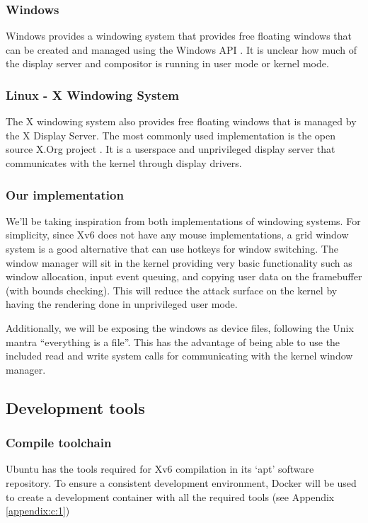 \subsubsection{Windows}
Windows provides a windowing system that provides free floating windows that can be created
and managed using the Windows API \cite{windowsapi:window}. It is unclear how much of the display
server and compositor is running in user mode or kernel mode.
\subsubsection{Linux - X Windowing System}
The X windowing system also provides free floating windows that is managed by the X Display Server. 
The most commonly used implementation is the open source X.Org project \cite{Xorg}. It is a userspace and unprivileged
display server that communicates with the kernel through display drivers.
\subsubsection{Our implementation}
We'll be taking inspiration from both implementations of windowing systems. For simplicity,
since Xv6 does not have any mouse implementations, a grid window system is a good alternative
that can use hotkeys for window switching. The window manager will sit in the kernel providing 
very basic functionality such as window allocation, input event queuing, and copying
user data on the framebuffer (with bounds checking). This will reduce the attack surface
on the kernel by having the rendering done in unprivileged user mode.

Additionally, we will be exposing the windows as device files, following the Unix mantra
``everything is a file''. This has the advantage of being able to use the included
read and write system calls for communicating with the kernel window manager.

\subsection{Development tools}
\subsubsection{Compile toolchain}
Ubuntu has the tools required for Xv6 compilation in its `apt' software repository. 
To ensure a consistent development environment, Docker will be used to create a 
development container with all the required tools (see Appendix \ref{appendix:c:1})
